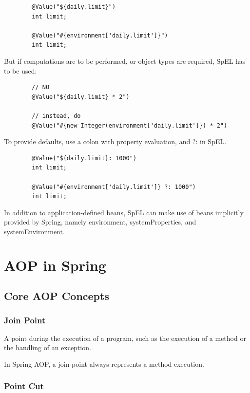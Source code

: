 \documentclass{scrartcl}
\begin{document}
    \begin{lstlisting}
        @Value("${daily.limit}")
        int limit;

        @Value("#{environment['daily.limit']}")
        int limit;
    \end{lstlisting}

    But if computations are to be performed, or object types are required, SpEL has to be used:

    \begin{lstlisting}
        // NO
        @Value("${daily.limit} * 2")

        // instead, do
        @Value("#{new Integer(environment['daily.limit']}) * 2")
    \end{lstlisting}

    To provide defaults, use a colon with property evaluation, and ?: in SpEL.

    \begin{lstlisting}
        @Value("${daily.limit}: 1000")
        int limit;

        @Value("#{environment['daily.limit']} ?: 1000")
        int limit;
    \end{lstlisting}

    In addition to application-defined beans, SpEL can make use of beans implicitly provided by Spring, namely environment, systemProperties, and systemEnvironment.

\section{AOP in Spring}

\subsection{Core AOP Concepts}

\subsubsection{Join Point}

A point during the execution of a program, such as the execution of a method or the handling of an exception.

In Spring AOP, a join point always represents a method execution.


\subsubsection{Point Cut}
\end{document}
